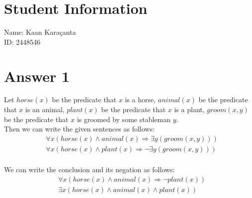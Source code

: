 \documentclass[12pt]{article}
\begin{document}
\section*{Student Information}

Name: Kaan Karaçanta \\

ID: 2448546 \\


\section*{Answer 1}

Let $ horse(x) $ be the predicate that $ x $ is a horse, $animal(x) $ be the predicate that $ x $ is an animal, $ plant(x) $ be the predicate that $ x $ is a plant, $ groom(x, y) $ be the predicate that $ x $ is groomed by some stableman $ y $. \\

Then we can write the given sentences as follows:
\begin{align*}
    & \forall x (horse(x) \wedge animal(x) \Rightarrow \exists y (groom(x, y))) \\
    & \forall x (horse(x) \wedge plant(x) \Rightarrow \neg \exists y (groom(x, y))) \\
\end{align*}

We can write the conclusion and its negation as follows:
\begin{align*}
    & \forall x (horse(x) \wedge animal(x) \Rightarrow \neg plant(x)) \\
    & \exists x (horse(x) \wedge animal(x) \wedge plant(x)) \\
\end{align*}
\end{document}
